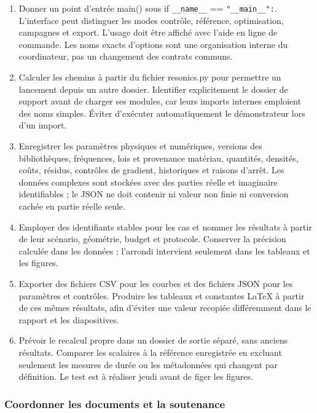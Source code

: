 \documentclass[11pt,a4paper]{article}
\begin{document}
\begin{enumerate}
\item Donner un point d'entrée {\small\ttfamily main()} sous {\small\ttfamily if \nolinkurl{__name__} == \nolinkurl{"__main__":}}. L'interface peut distinguer les modes contrôle, référence, optimisation, campagnes et export. L'usage doit être affiché avec l'aide en ligne de commande. Les noms exacts d'options sont une organisation interne du coordinateur, pas un changement des contrats communs.
\item Calculer les chemins à partir du fichier {\small\ttfamily resonics.py} pour permettre un lancement depuis un autre dossier. Identifier explicitement le dossier de support avant de charger ses modules, car leurs imports internes emploient des noms simples. Éviter d'exécuter automatiquement le démonstrateur lors d'un import.
\item Enregistrer les paramètres physiques et numériques, versions des bibliothèques, fréquences, lois et provenance matériau, quantités, densités, coûts, résidus, contrôles de gradient, historiques et raisons d'arrêt. Les données complexes sont stockées avec des parties réelle et imaginaire identifiables ; le JSON ne doit contenir ni valeur non finie ni conversion cachée en partie réelle seule.
\item Employer des identifiants stables pour les cas et nommer les résultats à partir de leur scénario, géométrie, budget et protocole. Conserver la précision calculée dans les données ; l'arrondi intervient seulement dans les tableaux et les figures.
\item Exporter des fichiers CSV pour les courbes et des fichiers JSON pour les paramètres et contrôles. Produire les tableaux et constantes LaTeX à partir de ces mêmes résultats, afin d'éviter une valeur recopiée différemment dans le rapport et les diapositives.
\item Prévoir le recalcul propre dans un dossier de sortie séparé, sans anciens résultats. Comparer les scalaires à la référence enregistrée en excluant seulement les mesures de durée ou les métadonnées qui changent par définition. Le test est à réaliser jeudi avant de figer les figures.
\end{enumerate}

\subsubsection{Coordonner les documents et la soutenance}
\end{document}
